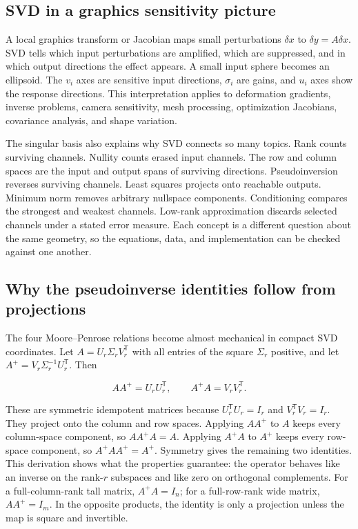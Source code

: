 \subsection{SVD in a graphics sensitivity picture}\label{02-foundations-ii-ch024-svd-in-a-graphics-sensitivity-picture}

\hypertarget{02-foundations-ii-ch024-svd-in-a-graphics-sensitivity-picture}{}

A local graphics transform or Jacobian maps small perturbations \(\delta x\) to \(\delta y=A\delta x\). SVD tells which input perturbations are amplified, which are suppressed, and in which output directions the effect appears. A small input sphere becomes an ellipsoid. The \(v_i\) axes are sensitive input directions, \(\sigma_i\) are gains, and \(u_i\) axes show the response directions. This interpretation applies to deformation gradients, inverse problems, camera sensitivity, mesh processing, optimization Jacobians, covariance analysis, and shape variation.

The singular basis also explains why SVD connects so many topics. Rank counts surviving channels. Nullity counts erased input channels. The row and column spaces are the input and output spans of surviving directions. Pseudoinversion reverses surviving channels. Least squares projects onto reachable outputs. Minimum norm removes arbitrary nullspace components. Conditioning compares the strongest and weakest channels. Low-rank approximation discards selected channels under a stated error measure. Each concept is a different question about the same geometry, so the equations, data, and implementation can be checked against one another.

\subsection{Why the pseudoinverse identities follow from projections}\label{02-foundations-ii-ch024-why-the-pseudoinverse-identities-follow-from-projections}

\hypertarget{02-foundations-ii-ch024-why-the-pseudoinverse-identities-follow-from-projections}{}

The four Moore--Penrose relations become almost mechanical in compact SVD coordinates. Let \(A=U_r\Sigma_rV_r^\mathsf T\) with all entries of the square \(\Sigma_r\) positive, and let \(A^+=V_r\Sigma_r^{-1}U_r^\mathsf T\). Then

\[
AA^+=U_rU_r^\mathsf T,\qquad A^+A=V_rV_r^\mathsf T.
\]

These are symmetric idempotent matrices because \(U_r^\mathsf T U_r=I_r\) and \(V_r^\mathsf T V_r=I_r\). They project onto the column and row spaces. Applying \(AA^+\) to \(A\) keeps every column-space component, so \(AA^+A=A\). Applying \(A^+A\) to \(A^+\) keeps every row-space component, so \(A^+AA^+=A^+\). Symmetry gives the remaining two identities. This derivation shows what the properties guarantee: the operator behaves like an inverse on the rank-\(r\) subspaces and like zero on orthogonal complements. For a full-column-rank tall matrix, \(A^+A=I_n\); for a full-row-rank wide matrix, \(AA^+=I_m\). In the opposite products, the identity is only a projection unless the map is square and invertible.

